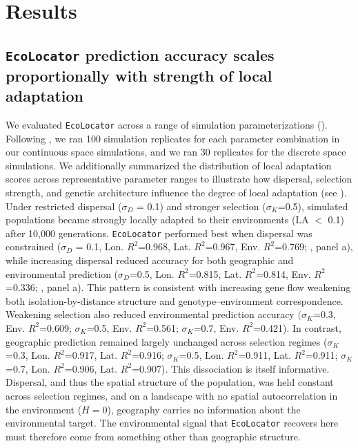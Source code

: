 \documentclass[]{article}
\newcommand{\ecolocator}{\texttt{EcoLocator}\xspace}
\begin{document}
\section{Results}

\subsection{\ecolocator prediction accuracy scales proportionally
with strength of local adaptation}

We evaluated \ecolocator
across a range of simulation parameterizations ().
Following \citet{booker_wza_2024},
we ran 100 simulation replicates for each parameter combination in our continuous space simulations,
and we ran 30 replicates for the discrete space simulations.
We additionally summarized
the distribution of local adaptation scores
across representative parameter ranges to illustrate
how dispersal, selection strength, and genetic architecture
influence the degree of local adaptation (see ).
Under restricted dispersal (\(\sigma_D\) = 0.1) and
stronger selection (\(\sigma_K\)=0.5),
simulated populations became strongly locally adapted
to their environments (LA $<$ 0.1) after 10,000 generations. 
\ecolocator performed best when dispersal was constrained
(\(\sigma_D\) = 0.1, Lon. $R^2$=0.968, Lat. $R^2$=0.967, Env. $R^2$=0.769;
, panel a),
while increasing dispersal reduced accuracy
for both geographic and environmental prediction 
(\(\sigma_D\)=0.5, Lon. $R^2$=0.815, Lat. $R^2$=0.814, Env. $R^2$=0.336;
, panel a).
This pattern is consistent with increasing gene flow weakening both
isolation-by-distance structure and genotype--environment correspondence.
Weakening selection also reduced environmental prediction accuracy 
\((\sigma_K\)=0.3, Env. $R^2$=0.609;
\(\sigma_K\)=0.5, Env. $R^2$=0.561;
\(\sigma_K\)=0.7, Env. $R^2$=0.421).
In contrast, geographic prediction remained largely unchanged
across selection regimes 
(\(\sigma_K\)=0.3, Lon. $R^2$=0.917, Lat. $R^2$=0.916;
 \(\sigma_K\)=0.5, Lon. $R^2$=0.911, Lat. $R^2$=0.911;
 \(\sigma_K\)=0.7, Lon. $R^2$=0.906, Lat. $R^2$=0.907).
This dissociation is itself informative.
Dispersal, and thus the spatial structure of the population,
was held constant across selection regimes,
and on a landscape with no spatial autocorrelation
in the environment ($H=0$),
geography carries no information about the environmental target.
The environmental signal that \ecolocator recovers here
must therefore come from something other than geographic structure.
\end{document}
